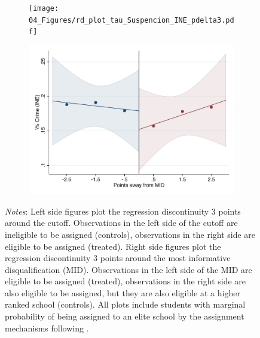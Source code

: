 \documentclass[oneside,11pt]{article}
\begin{document}
\begin{figure}[H]
\begin{center}
    \begin{subfigure}{0.475\textwidth}
        \centering
        \texttt{[image: 04\_Figures/rd\_plot\_tau\_Suspencion\_INE\_pdelta3.pdf]}
    \end{subfigure}
    \begin{subfigure}{0.475\textwidth}
        \centering
        \includegraphics[width=\textwidth]{04_Figures/rd_plot_mid_Suspencion_INE_pdelta3.pdf}
    \end{subfigure}
    \end{center}
    
\footnotesize
\textit{Notes}: Left side figures plot the regression discontinuity 3 points around the cutoff. Observations in the left side of the cutoff are ineligible to be assigned (controls), observations in the right side are eligible to be assigned (treated). Right side figures plot the regression discontinuity 3 points around the most informative disqualification (MID). Observations in the left side of the MID are eligible to be assigned (treated), observations in the right side are also eligible to be assigned, but they are also eligible at a higher ranked school (controls). All plots include students with marginal probability of being assigned to an elite school by the assignment mechanisms following \citet{abdulkadirouglu2022breaking}. 
\end{figure}
\end{document}
